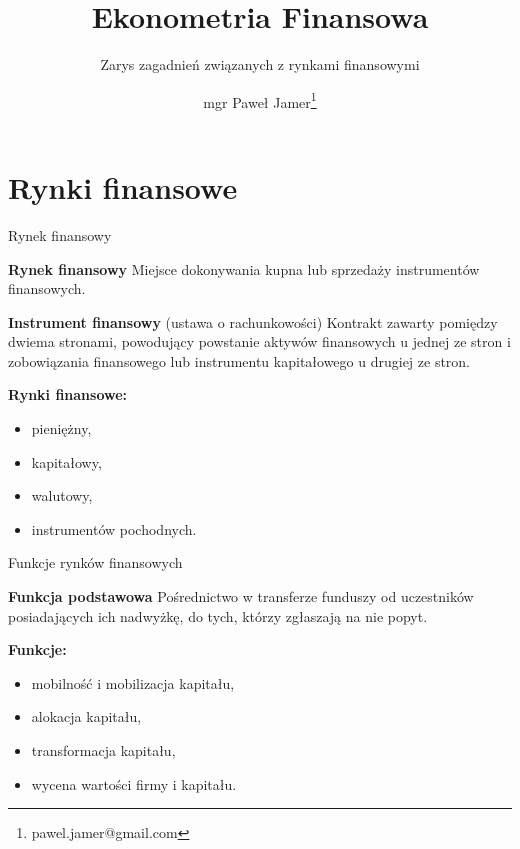 \documentclass[a4paper, 11pt]{beamer}
\title{Ekonometria Finansowa}
\subtitle{Zarys zagadnień związanych z rynkami finansowymi}
\author{mgr Paweł Jamer\thanks{pawel.jamer@gmail.com}}
\begin{document}
	\begin{frame}
		\titlepage
	\end{frame}
	
	\section{Rynki finansowe}

	\begin{frame}{Rynek finansowy}
		\begin{block}{\textbf{Rynek finansowy}}
			Miejsce dokonywania kupna lub sprzedaży instrumentów finansowych.
		\end{block}
		\begin{block}{\textbf{Instrument finansowy} (ustawa o rachunkowości)}
			Kontrakt zawarty pomiędzy dwiema stronami, powodujący powstanie aktywów
			finansowych u jednej ze stron i zobowiązania finansowego lub instrumentu
			kapitałowego u drugiej ze stron.
		\end{block}
		\textbf{Rynki finansowe:}
		\begin{itemize}
			\item pieniężny,
			\item kapitałowy,
			\item walutowy,
			\item instrumentów pochodnych.
		\end{itemize}
	\end{frame}

	\begin{frame}{Funkcje rynków finansowych}
		\begin{block}{\textbf{Funkcja podstawowa}}
			Pośrednictwo w transferze funduszy od uczestników posiadających ich nadwyżkę,
			do tych, którzy zgłaszają na nie popyt.
		\end{block}
		\textbf{Funkcje:}
		\begin{itemize}
			\item mobilność i mobilizacja kapitału,
			\item alokacja kapitału,
			\item transformacja kapitału,
			\item wycena wartości firmy i kapitału.
		\end{itemize}
	\end{frame}
	
\end{document}
